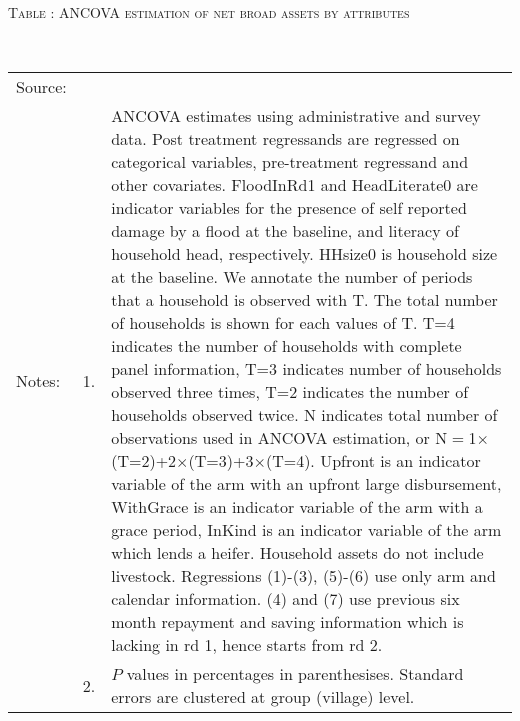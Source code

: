 \hspace{-1cm}\begin{minipage}[t]{14cm}
\hfil\textsc{\normalsize Table \thetable: ANCOVA estimation of net broad assets by attributes\label{tab ANCOVA net broad assets attributes}}\\
\setlength{\tabcolsep}{1pt}
\setlength{\baselineskip}{8pt}
\renewcommand{\arraystretch}{.55}
\hfil{}\\
\renewcommand{\arraystretch}{.8}
\setlength{\tabcolsep}{1pt}
\begin{tabular}{>{\hfill\scriptsize}p{1cm}<{}>{\hfill\scriptsize}p{.25cm}<{}>{\scriptsize}p{12cm}<{\hfill}}
Source:& \multicolumn{2}{l}{\scriptsize Estimated with GUK administrative and survey data.}\\
Notes: & 1. & ANCOVA estimates using administrative and survey data. Post treatment regressands are regressed on categorical variables, pre-treatment regressand and other covariates. \textsf{FloodInRd1} and \textsf{HeadLiterate0} are indicator variables for the presence of self reported damage by a flood at the baseline, and literacy of household head, respectively. \textsf{HHsize0} is household size at the baseline. We annotate the number of periods that a household is observed with \textsf{T}. The total number of households is shown for each values of \textsf{T}. \textsf{T=4} indicates the number of households with complete panel information, \textsf{T=3} indicates number of households observed three times, \textsf{T=2} indicates the number of households observed twice. \textsf{N} indicates total number of observations used in ANCOVA estimation, or \textsf{N$=$1$\times$(T=2)+2$\times$(T=3)+3$\times$(T=4)}.  \textsf{Upfront} is an indicator variable of the arm with an upfront large disbursement, \textsf{WithGrace} is an indicator variable of the arm with a grace period, \textsf{InKind} is an indicator variable of the arm which lends a heifer. Household assets do not include livestock. Regressions (1)-(3), (5)-(6) use only arm and calendar information. (4) and (7) use previous six month repayment and saving information which is lacking in rd 1, hence starts from rd 2.\\
& 2. & $P$ values in percentages in parenthesises. Standard errors are clustered at group (village) level.
\end{tabular}
\end{minipage}

